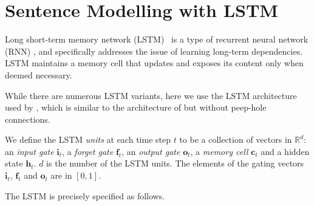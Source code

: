 \documentclass{article}
\def\h{\mathbf{h}}
\def\cc{\mathbf{c}}
\def\ii{\mathbf{i}}
\def\ff{\mathbf{f}}
\def\oo{\mathbf{o}}
\def\cc{\mathbf{c}}
\begin{document}
\section{Sentence Modelling with LSTM}


Long short-term memory network (LSTM)~\cite{hochreiter1997long} is a type of recurrent neural network (RNN) \cite{Elman:1990}, and
specifically addresses the issue of learning long-term dependencies. LSTM maintains a memory cell that updates and exposes its content only when deemed necessary.

While there are numerous LSTM variants, here we use the LSTM architecture used by \cite{jozefowicz2015empirical}, which is similar to the architecture of \cite{graves2013generating} but without peep-hole connections.

We define the LSTM \emph{units} at each time step $t$ to be a collection of vectors in $\mathbb{R}^d$: an \emph{input gate} $\ii_t$, a \emph{forget gate} $\ff_t$,  an \emph{output gate} $\oo_t$, a \emph{memory cell} $\cc_t$ and a hidden state $\h_t$. $d$ is the number of the LSTM units. The elements of the gating vectors $\ii_t$, $\ff_t$ and $\oo_t$ are in $[0, 1]$.

The LSTM is precisely specified as follows.
\end{document}
